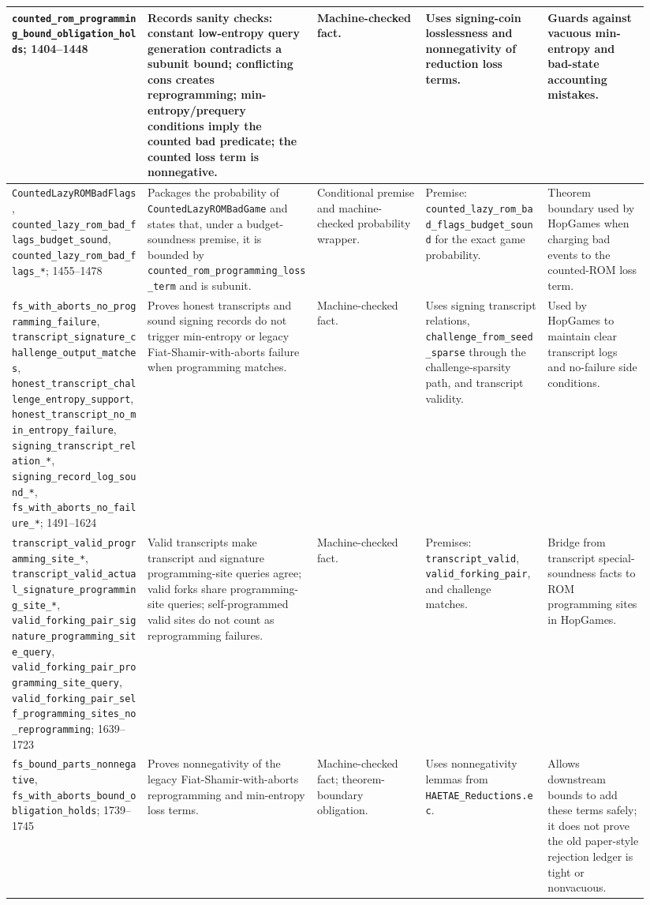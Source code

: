 \documentclass[11pt]{report}
\DeclareRobustCommand{\file}[1]{\ifmmode\text{\nolinkurl{#1}}\else\nolinkurl{#1}\fi}
\DeclareRobustCommand{\ec}[1]{\ifmmode\text{\nolinkurl{#1}}\else\nolinkurl{#1}\fi}
\theoremstyle{definition}
\theoremstyle{plain}
\begin{document}
\begin{longtable}{p{0.20\linewidth}p{0.25\linewidth}p{0.16\linewidth}p{0.18\linewidth}p{0.15\linewidth}}
\ec{counted\_rom\_programming\_bound\_obligation\_holds}; 1404--1448 &
Records sanity checks: constant low-entropy query generation contradicts a
subunit bound; conflicting cons creates reprogramming; min-entropy/prequery
conditions imply the counted bad predicate; the counted loss term is
nonnegative. &
Machine-checked fact. &
Uses signing-coin losslessness and nonnegativity of reduction loss terms. &
Guards against vacuous min-entropy and bad-state accounting mistakes. \\
\midrule
\ec{CountedLazyROMBadFlags},
\ec{counted\_lazy\_rom\_bad\_flags\_budget\_sound},
\ec{counted\_lazy\_rom\_bad\_flags\_*}; 1455--1478 &
Packages the probability of \ec{CountedLazyROMBadGame} and states that, under
a budget-soundness premise, it is bounded by
\ec{counted\_rom\_programming\_loss\_term} and is subunit. &
Conditional premise and machine-checked probability wrapper. &
Premise: \ec{counted\_lazy\_rom\_bad\_flags\_budget\_sound} for the exact
game probability. &
Theorem boundary used by HopGames when charging bad events to the counted-ROM
loss term. \\
\midrule
\ec{fs\_with\_aborts\_no\_programming\_failure},
\ec{transcript\_signature\_challenge\_output\_matches},
\ec{honest\_transcript\_challenge\_entropy\_support},
\ec{honest\_transcript\_no\_min\_entropy\_failure},
\ec{signing\_transcript\_relation\_*},
\ec{signing\_record\_log\_sound\_*},
\ec{fs\_with\_aborts\_no\_failure\_*}; 1491--1624 &
Proves honest transcripts and sound signing records do not trigger
min-entropy or legacy Fiat-Shamir-with-aborts failure when programming matches. &
Machine-checked fact. &
Uses signing transcript relations, \ec{challenge\_from\_seed\_sparse} through
the challenge-sparsity path, and transcript validity. &
Used by HopGames to maintain clear transcript logs and no-failure side
conditions. \\
\midrule
\ec{transcript\_valid\_programming\_site\_*},
\ec{transcript\_valid\_actual\_signature\_programming\_site\_*},
\ec{valid\_forking\_pair\_signature\_programming\_site\_query},
\ec{valid\_forking\_pair\_programming\_site\_query},
\ec{valid\_forking\_pair\_self\_programming\_sites\_no\_reprogramming};
1639--1723 &
Valid transcripts make transcript and signature programming-site queries agree;
valid forks share programming-site queries; self-programmed valid sites do not
count as reprogramming failures. &
Machine-checked fact. &
Premises: \ec{transcript\_valid}, \ec{valid\_forking\_pair}, and challenge
matches. &
Bridge from transcript special-soundness facts to ROM programming sites in
HopGames. \\
\midrule
\ec{fs\_bound\_parts\_nonnegative},
\ec{fs\_with\_aborts\_bound\_obligation\_holds}; 1739--1745 &
Proves nonnegativity of the legacy Fiat-Shamir-with-aborts reprogramming and
min-entropy loss terms. &
Machine-checked fact; theorem-boundary obligation. &
Uses nonnegativity lemmas from \file{HAETAE\_Reductions.ec}. &
Allows downstream bounds to add these terms safely; it does not prove the old
paper-style rejection ledger is tight or nonvacuous. \\
\bottomrule
\end{longtable}
\end{document}
